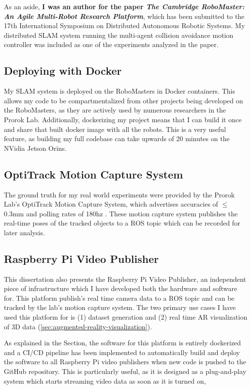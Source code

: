 As an aside, \textbf{I was an author for the paper \textit{The Cambridge RoboMaster: An Agile Multi-Robot Research Platform}}, which has been submitted to the 17th International Symposium on Distributed Autonomous Robotic Systems. My distributed SLAM system running the multi-agent collision avoidance motion controller was included as one of the experiments analyzed in the paper.

\subsection{Deploying with Docker}
\label{sec:deploying-with-docker}
My SLAM system is deployed on the RoboMasters in Docker containers. This allows my code to be compartmentalized from other projects being developed on the RoboMasters, as they are actively used by numerous researchers in the Prorok Lab. Additionally, dockerizing my project means that I can build it once and share that built docker image with all the robots. This is a very useful feature, as building my full codebase can take upwards of 20 minutes on the NVidia Jetson Orins.

\subsection{OptiTrack Motion Capture System}
\label{sec:optitrack-motion-capture-system}
The ground truth for my real world experiments were provided by the Prorok Lab's OptiTrack Motion Capture System, which advertises accuracies of $\leq$0.3mm and polling rates of 180hz \autocite{OptiTrackForRobotics}. These motion capture system publishes the real-time poses of the tracked objects to a ROS topic which can be recorded for later analysis.

\subsection{Raspberry Pi Video Publisher}
\label{sec:raspberry-pi-video-publisher}
This dissertation also presents the Raspberry Pi Video Publisher, an independent piece of infrastructure which I have developed both the hardware and software for. This platform publish's real time camera data to a ROS topic and can be tracked by the lab's motion capture system. The two primary use cases I have used this platform for is (1) dataset generation and (2) real time AR visualization of 3D data (\autoref{sec:augmented-reality-visualization}).

As explained in the  Section, the software for this platform is entirely dockerized and a CI/CD pipeline has been implemented to automatically build and deploy the software to all Raspberry Pi video publishers when new code is pushed to the GitHub repository. This is particularly useful, as it is designed as a plug-and-play system which starts streaming video data as soon as it is turned on,

